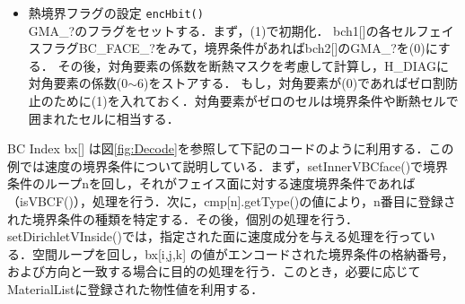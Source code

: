 \begin{enumerate}
\begin{itemize}

\vspace{2mm}

\item 熱境界フラグの設定 \verb|encHbit()|\\
GMA\_?のフラグをセットする．まず，(1)で初期化．
bch1[]の各セルフェイスフラグBC\_FACE\_?をみて，境界条件があればbch2[]のGMA\_?を(0)にする．
その後，対角要素の係数を断熱マスクを考慮して計算し，H\_DIAGに対角要素の係数(0$\sim6$)をストアする．
もし，対角要素が(0)であればゼロ割防止のために(1)を入れておく．対角要素がゼロのセルは境界条件や断熱セルで囲まれたセルに相当する．
\end{itemize}


%
\vspace{2mm}

\end{enumerate}





BC Index bx[] は図\ref{fig:Decode}を参照して下記のコードのように利用する．この例では速度の境界条件について説明している．まず，setInnerVBCface()で境界条件のループnを回し，それがフェイス面に対する速度境界条件であれば（isVBCF()），処理を行う．次に，cmp[n].getType()の値により，n番目に登録された境界条件の種類を特定する．その後，個別の処理を行う．setDirichletVInside()では，指定された面に速度成分を与える処理を行っている．空間ループを回し，bx[i,j,k] の値がエンコードされた境界条件の格納番号，および方向と一致する場合に目的の処理を行う．このとき，必要に応じて MaterialListに登録された物性値を利用する．

